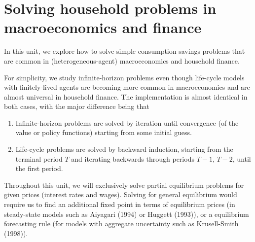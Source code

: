 \documentclass{scrartcl}
\providecommand{\tightlist}{%
      \setlength{\itemsep}{0pt}\setlength{\parskip}{0pt}}
\begin{document}
    
    \maketitle
	\tableofcontents
    
    

    
    \hypertarget{solving-household-problems-in-macroeconomics-and-finance}{%
\section{Solving household problems in macroeconomics and
finance}\label{solving-household-problems-in-macroeconomics-and-finance}}

In this unit, we explore how to solve simple consumption-savings
problems that are common in (heterogeneous-agent) macroeconomics and
household finance.

For simplicity, we study infinite-horizon problems even though
life-cycle models with finitely-lived agents are becoming more common in
macroeconomics and are almost universal in household finance. The
implementation is almost identical in both cases, with the major
difference being that

\begin{enumerate}
\def\labelenumi{\arabic{enumi}.}
\tightlist
\item
  Infinite-horizon problems are solved by iteration until convergence
  (of the value or policy functions) starting from some initial guess.
\item
  Life-cycle problems are solved by backward induction, starting from
  the terminal period \(T\) and iterating backwards through periods
  \(T-1\), \(T-2\), \etc until the first period.
\end{enumerate}

Throughout this unit, we will exclusively solve partial equilibrium
problems for given prices (interest rates and wages). Solving for
general equilibrium would require us to find an additional fixed point
in terms of equilibrium prices (in steady-state models such as Aiyagari
(1994) or Huggett (1993)), or a equilibrium forecasting rule (for models
with aggregate uncertainty such as Krusell-Smith (1998)).
\end{document}
